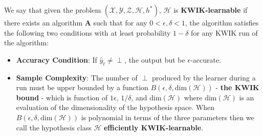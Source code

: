 \begin{dfn}
We say that given the problem $(\mathcal{X}, \mathcal{Y}, \mathcal{Z}, \mathcal{H}, h^*)$, $\mathcal{H}$ is \textbf{KWIK-learnable} if there exists an algorithm $\textbf{A}$ such that for any $0 < \epsilon, \delta < 1$, the algorithm satisfies the following two conditions with at least probability $1-\delta$ for any KWIK run of the algorithm:
\begin{itemize}
\item \textbf{Accuracy Condition}: If $\hat{y}_t \neq \perp$, the output but be $\epsilon$-accurate.
\item \textbf{Sample Complexity}: The number of $\perp$ produced by the learner during a run must be upper bounded by a function $B(\epsilon, \delta, \text{dim}(\mathcal{H}))$ - \textbf{the KWIK bound} - which is function of $1\epsilon$, $1/\delta$, and dim$(\mathcal{H})$ where dim$(\mathcal{H})$ is an evaluation of the dimensionality of the hypothesis space. When $B(\epsilon, \delta, \text{dim}(\mathcal{H}))$ is polynomial in terms of the three parameters then we call the hypothesis class $\mathcal{H}$ \textbf{efficiently KWIK-learnable}.
\end{itemize}
\end{dfn}


